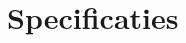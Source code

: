 \documentclass{article}
\begin{document}
\chapter{Specificaties}
\scriptsize

\normalsize
\end{document}
